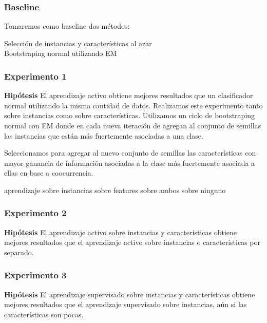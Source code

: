 \subsubsection{Baseline}
Tomaremos como baseline dos métodos:
\begin{description}
    \item[Selección de instancias y características al azar]
    \item[Bootstraping normal utilizando EM]  %
\end{description}


\subsubsection{Experimento 1}
\textbf{Hipótesis} El aprendizaje activo obtiene mejores resultados que un clasificador normal utilizando la misma cantidad de datos.
Realizamos este experimento tanto sobre instancias como sobre características.
Utilizamos un ciclo de bootstraping normal con EM donde en cada nueva iteración de agregan al conjunto de semillas las instancias que están más fuertemente asociadas a una clase.

Seleccionamos para agregar al nuevo conjunto de semillas las características con mayor ganancia de información asociadas a la clase más fuertemente asociada a ellas en base a coocurrencia. %

aprendizaje sobre instancias
sobre features
sobre ambos
sobre ninguno

\subsubsection{Experimento 2}
\textbf{Hipótesis} El aprendizaje activo sobre instancias y características obtiene mejores resultados que el aprendizaje activo sobre instancias o características por separado.

\subsubsection{Experimento 3}
\textbf{Hipótesis} El aprendizaje supervisado sobre instancias y características obtiene mejores resultados que el aprendizaje supervisado sobre instancias, aún si las características son pocas.


